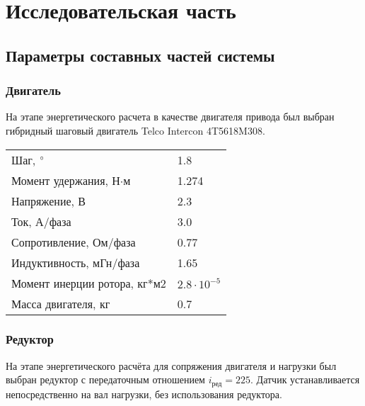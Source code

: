 \newpage
\section{Исследовательская часть}






\newpage
\subsection{Параметры составных частей системы}



\subsubsection{Двигатель}
На этапе энергетического расчета в качестве двигателя привода был выбран
гибридный шаговый двигатель Telco Intercon 4T5618M308.

\begin{table}
    \centering
    \begin{tabular}{l|l}
    \hline
    Шаг, $\degree$                          & 1.8                   \\
    Момент удержания, Н$\cdot$м             & 1.274                 \\
    Напряжение, В                           & 2.3                   \\
    Ток, А/фаза                             & 3.0                   \\
    Сопротивление, Ом/фаза                  & 0.77                  \\
    Индуктивность, мГн/фаза                 & 1.65                  \\
    Момент инерции ротора, кг*м2            & $2.8 \cdot 10^{-5}$   \\
    Масса двигателя, кг                     & 0.7                   \\
    \hline
    \end{tabular}
    \label{engine_params}
\end{table}

\subsubsection{Редуктор}
На этапе энергетического расчёта для сопряжения двигателя и нагрузки
был выбран редуктор с передаточным отношением $i_\text{ред} = 225$. Датчик
устанавливается непосредственно на вал нагрузки, без использования редуктора.

